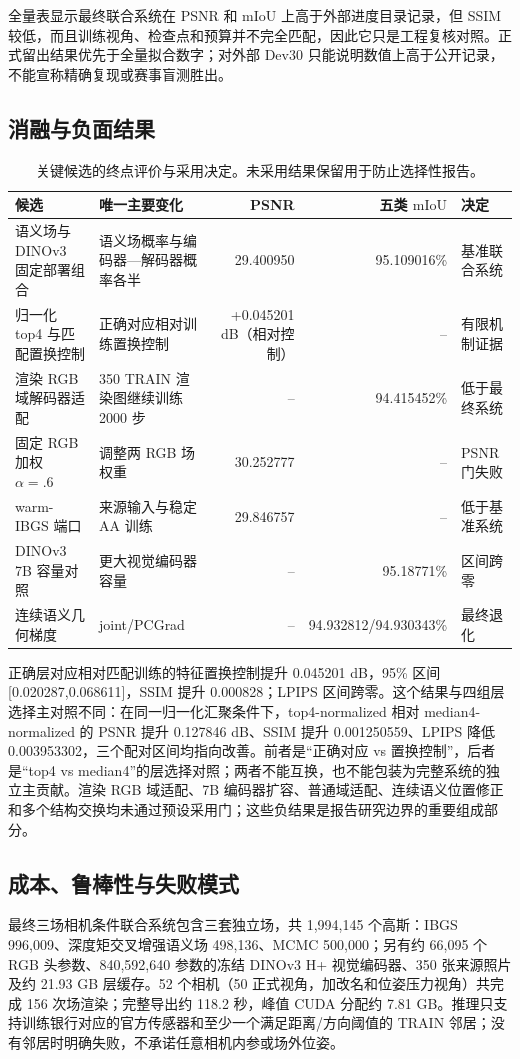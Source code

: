 \documentclass[UTF8,a4paper,11pt]{ctexart}
\newcommand{\mIoU}{\ensuremath{\mathrm{mIoU}}}
\begin{document}
全量表显示最终联合系统在 PSNR 和 mIoU 上高于外部进度目录记录，但 SSIM 较低，而且训练视角、检查点和预算并不完全匹配，因此它只是工程复核对照。正式留出结果优先于全量拟合数字；对外部 Dev30 只能说明数值上高于公开记录，不能宣称精确复现或赛事盲测胜出。

\subsection{消融与负面结果}
\begin{table}[t]
\centering
\caption{关键候选的终点评价与采用决定。未采用结果保留用于防止选择性报告。}
\label{tab:ablations}
\scriptsize
\begin{tabularx}{\linewidth}{>{\raggedright\arraybackslash}p{3.3cm} X r r l}
\toprule
候选 & 唯一主要变化 & PSNR & 五类 $\mIoU$ & 决定\\
\midrule
语义场与 DINOv3 固定部署组合 & 语义场概率与编码器—解码器概率各半 & 29.400950 & 95.109016\% & 基准联合系统\\
归一化 top4 与匹配置换控制 & 正确对应相对训练置换控制 & +0.045201 dB（相对控制） & -- & 有限机制证据\\
渲染 RGB 域解码器适配 & 350 TRAIN 渲染图继续训练 2000 步 & -- & 94.415452\% & 低于最终系统\\
固定 RGB 加权 $\alpha=.6$ & 调整两 RGB 场权重 & 30.252777 & -- & PSNR 门失败\\
warm-IBGS 端口 & 来源输入与稳定 AA 训练 & 29.846757 & -- & 低于基准系统\\
DINOv3 7B 容量对照 & 更大视觉编码器容量 & -- & 95.18771\% & 区间跨零\\
连续语义几何梯度 & joint/PCGrad & -- & 94.932812/94.930343\% & 最终退化\\
\bottomrule
\end{tabularx}
\end{table}

正确层对应相对匹配训练的特征置换控制提升 0.045201 dB，95\% 区间 [0.020287,0.068611]，SSIM 提升 0.000828；LPIPS 区间跨零。这个结果与四组层选择主对照不同：在同一归一化汇聚条件下，top4-normalized 相对 median4-normalized 的 PSNR 提升 0.127846 dB、SSIM 提升 0.001250559、LPIPS 降低 0.003953302，三个配对区间均指向改善。前者是“正确对应 vs 置换控制”，后者是“top4 vs median4”的层选择对照；两者不能互换，也不能包装为完整系统的独立主贡献。渲染 RGB 域适配、7B 编码器扩容、普通域适配、连续语义位置修正和多个结构交换均未通过预设采用门；这些负结果是报告研究边界的重要组成部分。

\subsection{成本、鲁棒性与失败模式}
最终三场相机条件联合系统包含三套独立场，共 1,994,145 个高斯：IBGS 996,009、深度矩交叉增强语义场 498,136、MCMC 500,000；另有约 66,095 个 RGB 头参数、840,592,640 参数的冻结 DINOv3 H+ 视觉编码器、350 张来源照片及约 21.93 GB 层缓存。52 个相机（50 正式视角，加改名和位姿压力视角）共完成 156 次场渲染；完整导出约 118.2 秒，峰值 CUDA 分配约 7.81 GB。推理只支持训练银行对应的官方传感器和至少一个满足距离/方向阈值的 TRAIN 邻居；没有邻居时明确失败，不承诺任意相机内参或场外位姿。
\end{document}
